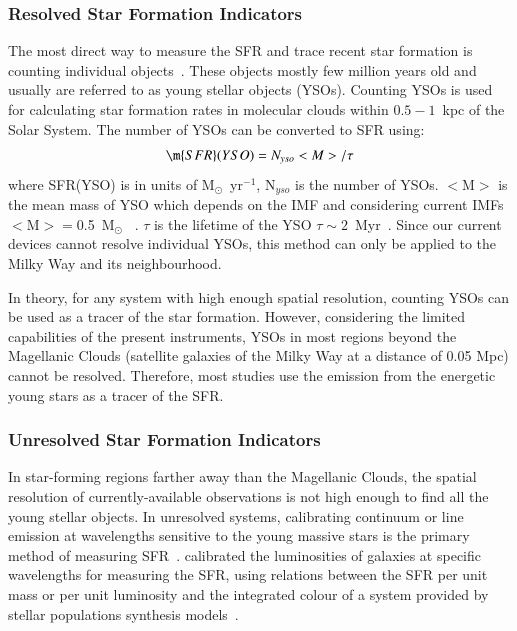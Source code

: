 \subsubsection{Resolved Star Formation Indicators}
The most direct way to measure the SFR and trace recent star formation is counting individual objects~\citep{Kennicutt12}. 
These objects mostly few million years old and usually are referred to as young stellar objects (YSOs). 
Counting YSOs is used for calculating star formation rates in molecular clouds within $0.5- 1$~kpc of the Solar System. 
The number of YSOs can be converted to SFR using: 
\begin{equation}
\m {SFR}(YSO) = N_{yso} <M>/\tau 
\end{equation}
where SFR(YSO) is in units of M$_{\odot}$~yr$^{-1}$, N$_{yso}$ is the number of YSOs.
$<$M$>$ is the mean mass of YSO which depends on the IMF and considering current IMFs $<$M$> = $0.5~M$_{\odot}$ ~\citep[][]{Kennicutt12}. 
$\tau$ is the lifetime of the YSO  $\tau \sim 2$~Myr~\citep{Evans09}. 
Since our current devices cannot resolve individual YSOs, this method can only be applied to the Milky Way and its neighbourhood. 

In theory, for any system with high enough spatial resolution, counting YSOs can be used as a tracer of the star formation. 
However, considering the limited capabilities of the present instruments, YSOs in most regions beyond the Magellanic Clouds (satellite galaxies of the Milky Way at a distance of 0.05 Mpc) cannot be resolved. 
Therefore, most studies use the emission from the energetic young stars as a tracer of the SFR. 



\subsubsection{Unresolved Star Formation Indicators}

In star-forming regions farther away than the Magellanic Clouds, the spatial resolution of currently-available observations is not high enough to find all the young stellar objects. 
In unresolved systems, calibrating continuum or line emission at wavelengths sensitive to the young massive stars is the primary method of measuring SFR~\citep[e.g.,][]{Kennicutt98b, Kewley02, Bell03, Calzetti07, Calzetti08, Calzetti10, Calzetti13, Kennicutt07, Kennicutt09, Boquien10, Hao11, Kennicutt12}. 
\cite{Kennicutt98b} calibrated the luminosities of galaxies at specific wavelengths for measuring the SFR, using relations between the SFR per unit mass or per unit luminosity and the integrated colour of a system provided by stellar populations synthesis models~\citep[e.g.,][]{Bruzual93}. 

